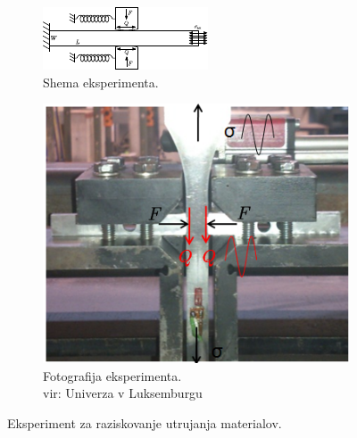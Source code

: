 \documentclass[12pt,a4paper,twoside]{article}
\theoremstyle{definition} %
\theoremstyle{plain} %
\numberwithin{equation}{section}
\begin{document}
\begin{figure}[!h]
  \begin{subfigure}[t]{0.60\textwidth}
    \centering
    \includegraphics[width=\textwidth]{images/fwo_shema.pdf}
    \caption{Shema eksperimenta.}
    \label{fig:fwo-shema}
  \end{subfigure}
  \hspace{1em}
  \begin{subfigure}[t]{0.35\textwidth}
    \centering
    \includegraphics[width=\textwidth]{images/experiment.png}
    \caption[Fotografija eksperimenta]{Fotografija eksperimenta. \\ vir: Univerza v Luksemburgu}
    \label{fig:fwo-experiment}
  \end{subfigure}
  \caption{Eksperiment za raziskovanje utrujanja materialov.}
\end{figure}
\end{document}
